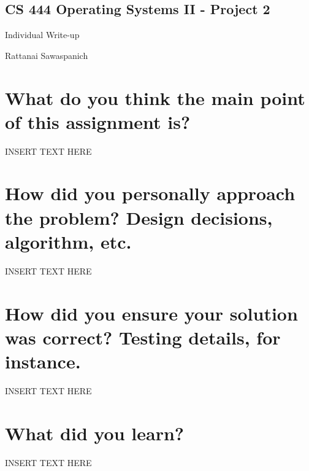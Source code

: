 \documentclass[letterpaper,10pt,titlepage,fleqn]{article}
\begin{document}
\pagestyle{empty}

\begin{center}
\section*{CS 444 Operating Systems II - Project 2}
Individual Write-up

Rattanai Sawaspanich
\end{center}


\section*{What do you think the main point of this assignment is?}

INSERT TEXT HERE

\section*{How did you personally approach the problem? Design decisions, algorithm, etc.}

INSERT TEXT HERE

\section*{How did you ensure your solution was correct? Testing details, for instance.}

INSERT TEXT HERE

\section*{What did you learn?}

INSERT TEXT HERE
\end{document}
